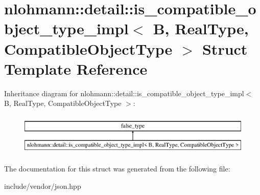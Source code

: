 \hypertarget{structnlohmann_1_1detail_1_1is__compatible__object__type__impl}{}\section{nlohmann\+:\+:detail\+:\+:is\+\_\+compatible\+\_\+object\+\_\+type\+\_\+impl$<$ B, Real\+Type, Compatible\+Object\+Type $>$ Struct Template Reference}
\label{structnlohmann_1_1detail_1_1is__compatible__object__type__impl}
Inheritance diagram for nlohmann\+:\+:detail\+:\+:is\+\_\+compatible\+\_\+object\+\_\+type\+\_\+impl$<$ B, Real\+Type, Compatible\+Object\+Type $>$\+:\begin{figure}[H]
\begin{center}
\leavevmode
\includegraphics[height=2.000000cm]{dc/da5/structnlohmann_1_1detail_1_1is__compatible__object__type__impl}
\end{center}
\end{figure}


The documentation for this struct was generated from the following file\+:\begin{DoxyCompactItemize}
\item 
include/vendor/json.\+hpp\end{DoxyCompactItemize}
